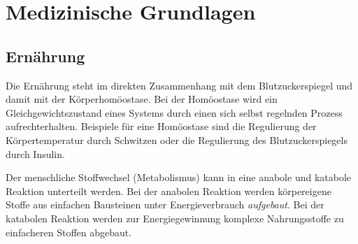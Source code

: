 \chapter{Medizinische Grundlagen}

\section{Ernährung}

Die Ernährung steht im direkten Zusammenhang mit dem Blutzuckerspiegel und damit mit der Körperhomöostase. Bei der Homöostase wird ein Gleichgewichtszustand eines Systems durch einen sich selbst regelnden Prozess aufrechterhalten. Beispiele für eine Homöostase sind die Regulierung der Körpertemperatur durch Schwitzen oder die Regulierung des Blutzuckerspiegels durch Insulin. 

Der menschliche Stoffwechsel (Metabolismus) kann in eine anabole und katabole Reaktion unterteilt werden. Bei der anabolen Reaktion werden körpereigene Stoffe aus einfachen Bausteinen unter Energieverbrauch \textit{aufgebaut}. Bei der katabolen Reaktion werden zur Energiegewinnung komplexe Nahrungsstoffe zu einfacheren Stoffen abgebaut. 


